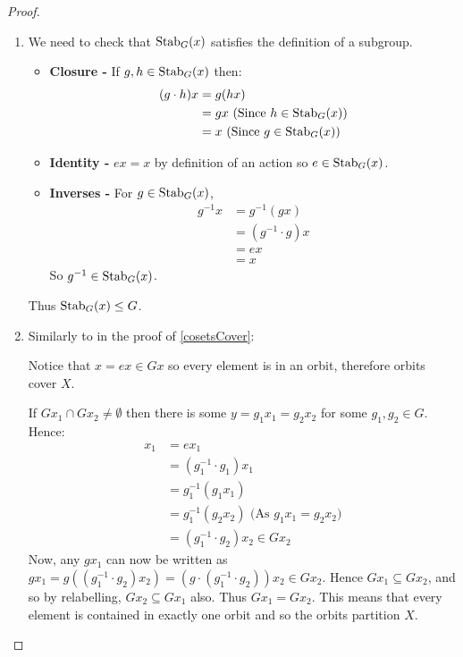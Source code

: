 \documentclass[../main.tex]{subfiles}
\begin{document}
\begin{proof}
  \begin{enumerate}
    \item We need to check that $\operatorname{Stab}_G(x)$ satisfies the definition of a subgroup.
      \begin{itemize}
        \item \textbf{Closure - }
          If $g, h \in \operatorname{Stab}_G(x)$ then:
          \begin{align*}
            (g \cdot h)x &= g(hx) \\
                    &= gx \text{ (Since $h \in \operatorname{Stab}_G(x)$)}\\
                    &= x \text{ (Since $g \in \operatorname{Stab}_G(x)$)}
          \end{align*}
        \item \textbf{Identity - } $ex = x$ by definition of an action so $e \in \operatorname{Stab}_G(x)$.
        \item \textbf{Inverses - }
          For $g \in \operatorname{Stab}_G(x)$,
          \begin{align*}
            g^{-1}x &= g^{-1}(gx) \\
                    &= (g^{-1} \cdot g)x \\
                    &= ex \\
                    &= x
          \end{align*}
          So $g^{-1} \in \operatorname{Stab}_G(x)$.
      \end{itemize}
      Thus $\operatorname{Stab}_G(x) \leq G$.
    \item Similarly to in the proof of \cref{cosetsCover}:

      Notice that $x = ex \in Gx$ so every element is in an orbit, therefore orbits cover $X$.

      If $Gx_1 \cap Gx_2 \neq \emptyset$ then there is some $y = g_1 x_1 = g_2 x_2$ for some $g_1, g_2 \in G$.
      Hence:
      \begin{align*}
        x_1 &= ex_1 \\
            &=(g^{-1}_{1} \cdot g_1) x_1 \\
            &= g^{-1}_1 (g_1 x_1) \\
            &= g^{-1}_1 (g_2 x_2) \text{ (As $g_1 x_1 = g_2 x_2$)} \\
            &= (g^{-1}_{1} \cdot g_2)x_2 \in Gx_2
      \end{align*}
      Now, any $gx_1$ can now be written as $gx_1 = g((g^{-1}_{1} \cdot g_2)x_2) = (g \cdot (g^{-1}_{1} \cdot g_2))x_2 \in Gx_2$.
      Hence $Gx_1 \subseteq Gx_2$, and so by relabelling, $Gx_2 \subseteq Gx_1$ also.
      Thus $Gx_1 = Gx_2$.
      This means that every element is contained in exactly one orbit and so the orbits partition $X$.
  \end{enumerate}
\end{proof}
\end{document}
